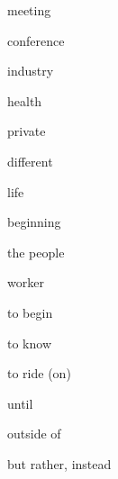 \documentclass[avery5371,grid,frame]{flashcards}
\begin{document}
\begin{flashcard}{\LARGE meeting}
\LARGE {}
\end{flashcard}
\begin{flashcard}{\LARGE conference}
\LARGE {}
\end{flashcard}
\begin{flashcard}{\LARGE industry}
\LARGE {}
\end{flashcard}
\begin{flashcard}{\LARGE health}
\LARGE {}
\end{flashcard}
\begin{flashcard}{\LARGE private}
\LARGE {}
\end{flashcard}
\begin{flashcard}{\LARGE different}
\LARGE {}
\end{flashcard}
\begin{flashcard}{\LARGE life}
\LARGE {}
\end{flashcard}
\begin{flashcard}{\LARGE beginning}
\LARGE {}
\end{flashcard}
\begin{flashcard}{\LARGE the people}
\LARGE {}
\end{flashcard}
\begin{flashcard}{\LARGE worker}
\LARGE {}
\end{flashcard}
\begin{flashcard}{\LARGE to begin}
\LARGE {}
\end{flashcard}
\begin{flashcard}{\LARGE to know}
\LARGE {}
\end{flashcard}
\begin{flashcard}{\LARGE to ride (on)}
\LARGE {}
\end{flashcard}
\begin{flashcard}{\LARGE until}
\LARGE {}
\end{flashcard}
\begin{flashcard}{\LARGE outside of}
\LARGE {}
\end{flashcard}
\begin{flashcard}{\LARGE but rather, instead}
\LARGE {}
\end{flashcard}
\end{document}
